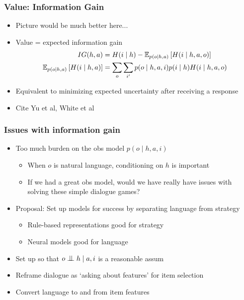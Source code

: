 \documentclass{beamer}
\newcommand{\bigCI}{\mathrel{\text{\scalebox{1.07}{$\perp\mkern-10mu\perp$}}}}
\begin{document}
\begin{frame}
\frametitle{Value: Information Gain}
\begin{itemize}
\item Picture would be much better here...
\item Value = expected information gain
\begin{align*}
IG(h, a) &= H(i \mid h) - \mathbb{E}_{p(o\mid h,a)}\left[H(i \mid h, a, o)\right]\\
\mathbb{E}_{p(o\mid h,a)}\left[H(i \mid h, a)\right] &= \sum_o\sum_{i'}p(o\mid h,a,i)p(i\mid h)H(i \mid h,a,o)
\end{align*}
\item Equivalent to minimizing expected uncertainty after receiving a response
\item Cite Yu et al, White et al
\end{itemize}
\end{frame}

\begin{frame}
\frametitle{Issues with information gain}
\begin{itemize}
\item Too much burden on the obs model $p(o \mid h,a,i)$
    \begin{itemize}
    \item When $o$ is natural language, conditioning on $h$ is important
    \item If we had a great obs model, would we have really have issues
        with solving these simple dialogue games?
    \end{itemize}
\item Proposal: Set up models for success by separating language from strategy
    \begin{itemize}
    \item Rule-based representations good for strategy
    \item Neural models good for language
    \end{itemize}
\item Set up so that $o \bigCI h \mid a,i$ is a reasonable assum
\item Reframe dialogue as `asking about features' for item selection
\item Convert language to and from item features
\end{itemize}
\end{frame}
\end{document}
